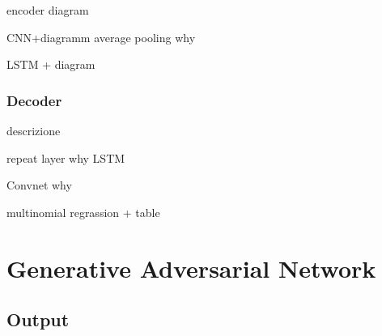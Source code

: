 encoder diagram

CNN+diagramm
average pooling why

LSTM + diagram


\subsubsection{Decoder}
descrizione

repeat layer why
LSTM

Convnet why

multinomial regrassion + table



\section{Generative Adversarial Network}
\label{advinterno}

\subsection{Output}
\label{advoutput}


